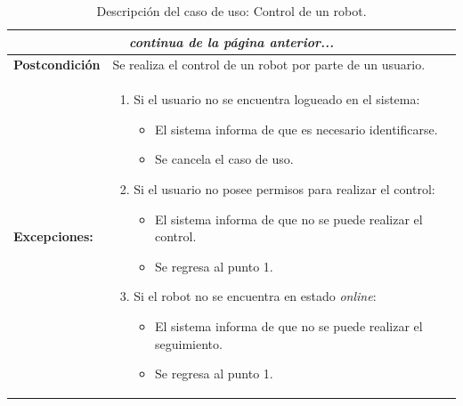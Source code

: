 \begin{table}[H]
  \begin{center}
    \begin{tabular}{|p{3.5cm}|p{10cm}|}
     \multicolumn{2}{c}{\emph{continua de la página anterior...}}\\
     \hline
      
     {\textbf{Postcondición}} & {Se realiza el control de un robot por parte de un usuario.}\\
     \hline
      {\textbf{Excepciones:}} & {
	\begin{enumerate}
	\item Si el usuario no se encuentra logueado en el sistema:
	\begin{itemize}
	  \item El sistema informa de que es necesario identificarse.
	  \item Se cancela el caso de uso.
	\end{itemize}
	\item Si el usuario no posee permisos para realizar el control:
	  \begin{itemize}
	    \item El sistema informa de que no se puede realizar el control.
	    \item Se regresa al punto 1.
	  \end{itemize}
	  \item Si el robot no se encuentra en estado \emph{online}:
	  \begin{itemize}
	    \item El sistema informa de que no se puede realizar el seguimiento.
	    \item Se regresa al punto 1.
	  \end{itemize}
	\end{enumerate}
	}\\
      \hline
    \end{tabular}
  \end{center}
\caption{Descripción del caso de uso: Control de un robot.}
\end{table}



